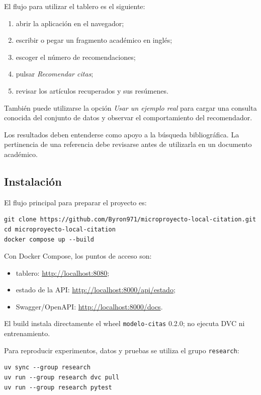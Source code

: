 \documentclass[9pt]{article}
\begin{document}
El flujo para utilizar el tablero es el siguiente:

\begin{enumerate}
    \item abrir la aplicación en el navegador;
    \item escribir o pegar un fragmento académico en inglés;
    \item escoger el número de recomendaciones;
    \item pulsar \textit{Recomendar citas};
    \item revisar los artículos recuperados y sus resúmenes.
\end{enumerate}

También puede utilizarse la opción \textit{Usar un ejemplo real} para cargar
una consulta conocida del conjunto de datos y observar el comportamiento del
recomendador.

Los resultados deben entenderse como apoyo a la búsqueda bibliográfica. La
pertinencia de una referencia debe revisarse antes de utilizarla en un documento
académico.

\subsection{Instalación}

El flujo principal para preparar el proyecto es:

\begin{verbatim}
git clone https://github.com/Byron971/microproyecto-local-citation.git
cd microproyecto-local-citation
docker compose up --build
\end{verbatim}

Con Docker Compose, los puntos de acceso son:

\begin{itemize}[leftmargin=1.4em, itemsep=0pt, topsep=1pt]
  \item tablero: \url{http://localhost:8080};
  \item estado de la API: \url{http://localhost:8000/api/estado};
  \item Swagger/OpenAPI: \url{http://localhost:8000/docs}.
\end{itemize}

El build instala directamente el wheel \texttt{modelo-citas} 0.2.0; no ejecuta
DVC ni entrenamiento.

Para reproducir experimentos, datos y pruebas se utiliza el grupo
\texttt{research}:

\begin{verbatim}
uv sync --group research
uv run --group research dvc pull
uv run --group research pytest
\end{verbatim}
\end{document}
